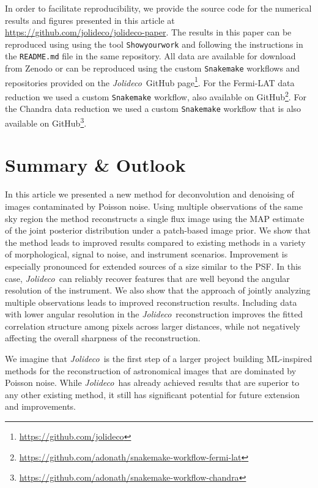 \documentclass[twocolumn, lineno]{aastex631}
\newcommand{\jolideco}{\textit{Jolideco}~}
\begin{document}
    In order to facilitate reproducibility, we provide the source code for the numerical results
    and figures presented in this article at \url{https://github.com/jolideco/jolideco-paper}. The results in this paper can be reproduced using using the tool \texttt{Showyourwork} \citep{Luger2021} and following the instructions in the \texttt{README.md} file in the same repository. All data are available for download from Zenodo or can be reproduced using the custom  \texttt{Snakemake} workflows and repositories provided on the \jolideco GitHub page\footnote{\url{https://github.com/jolideco}}. For the Fermi-LAT data reduction we used a custom \texttt{Snakemake} workflow, also  available on GitHub\footnote{\url{https://github.com/adonath/snakemake-workflow-fermi-lat}}. For the Chandra data reduction we used a custom \texttt{Snakemake} workflow that is also available on GitHub\footnote{\url{https://github.com/adonath/snakemake-workflow-chandra}}.

            
    
    \section{Summary \& Outlook}
    In this article we presented a new method for deconvolution and denoising of images contaminated by Poisson noise. Using multiple observations of the same sky region the method reconstructs a single flux image using the MAP estimate of the joint posterior distribution under a patch-based image prior. We show that the method leads to improved results compared to existing methods in a variety of morphological, signal to noise, and instrument scenarios. Improvement is especially pronounced for extended sources of a size similar to the PSF. In this case, \jolideco can reliably recover features that are well beyond the angular resolution of the instrument. We also show that the approach of jointly analyzing multiple observations leads to improved reconstruction results. Including data with lower angular resolution in the \jolideco reconstruction improves the fitted correlation structure among pixels across larger distances, while not negatively affecting the overall sharpness of the reconstruction.

    We imagine that \jolideco is the first step of a larger project building ML-inspired methods for the reconstruction of astronomical images that are dominated by Poisson noise. While \jolideco has already achieved results that are superior to any other existing method, it still has significant potential for future extension and improvements.
    
\end{document}

